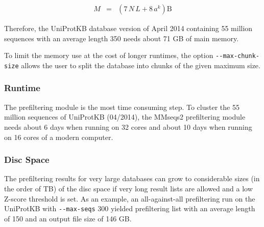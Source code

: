 \documentclass[11pt,a4paper]{scrreprt}
\begin{document}
\begin{eqnarray*}
M & = & (7\, N\, L+8\, a^{k})\mathrm{B}
\end{eqnarray*}

Therefore, the UniProtKB database version of April 2014 containing 55 million sequences with an average length 350 needs about 71 GB of main memory. 

To limit the memory use at the cost of longer runtimes, the option \texttt{-{}-max-chunk-size} allows the user to split the database into chunks of the given maximum size. 
\subsubsection{Runtime}
The prefiltering module is the most time consuming step. To cluster the 55 million sequences of UniProtKB (04/2014), the MMseqs2 prefiltering module needs about 6 days when running on 32 cores and about 10 days when running on 16 cores of a modern computer.
\subsubsection{Disc Space}
The prefiltering results for very large databases can grow to considerable sizes (in the order of TB) of the disc space if very long result lists are allowed and a low Z-score threshold is set. As an example, an all-against-all prefiltering run on the UniProtKB with \texttt{-{}-max-seqs} 300 yielded prefiltering list with an average length of 150 and an output file size of 146 GB.
\end{document}

